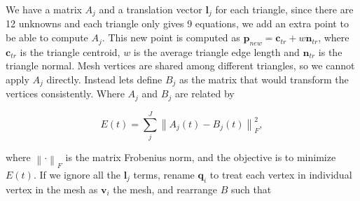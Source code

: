 \documentclass[12pt]{article}
\begin{document}
We have a matrix $A_{j}$ and a translation vector $\mathbf{l}_j$ for each triangle, since there are 12 unknowns and each triangle only gives 9 equations, we add an extra point to be able to compute $A_j$.
This new point is computed as $\mathbf{p}_{new} = \mathbf{c}_{tr} + w\mathbf{n}_{tr}$, where $\mathbf{c}_{tr}$ is the triangle centroid, $w$ is the average triangle edge length and $\mathbf{n}_{tr}$ is the triangle normal. 
Mesh vertices are shared among different triangles, so we cannot apply $A_j$ directly.
Instead lets define $B_{j}$ as the matrix that would transform the vertices consistently.
Where $A_j$ and $B_j$ are related by

\begin{equation*}
E(t) = \sum_{j}^J \left \| A_j(t) - B_j(t) \right \|^2_F,
\end{equation*}

where $\left \| \cdot \right \|_F$ is the matrix Frobenius norm, and the objective is to minimize $E(t)$.
If we ignore all the $\mathbf{l}_j$ terms, rename $\mathbf{q}_i$ to treat each vertex in individual vertex in the mesh as $\mathbf{v}_i$ the mesh, and rearrange $B$ such that
\end{document}
